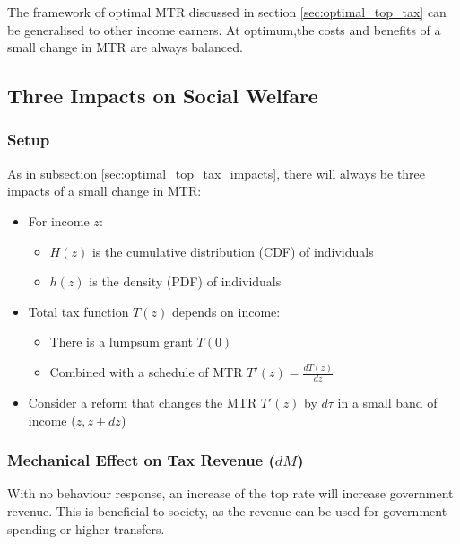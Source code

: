         The framework of optimal MTR discussed in section \ref{sec:optimal_top_tax} can be generalised to other income earners. At optimum,the costs and benefits of a small change in MTR are always balanced.

    \subsection{Three Impacts on Social Welfare}

        \subsubsection{Setup}
        
        As in subsection \ref{sec:optimal_top_tax_impacts}, there will always be three impacts of a small change in MTR:

        \begin{itemize}
            \item For income $z$:
            \begin{itemize}
                \item $H(z)$ is the cumulative distribution (CDF) of individuals
                \item $h(z)$ is the density (PDF) of individuals
            \end{itemize}
            \item Total tax function $T(z)$ depends on income:
            \begin{itemize}
                \item There is a lumpsum grant $T(0)$
                \item Combined with a schedule of MTR $T'(z)=\frac{dT(z)}{dz}$
            \end{itemize}
            \item Consider a reform that changes the MTR $T'(z)$ by $d\tau$ in a small band of income ($z,z+dz$)
        \end{itemize}
        
        \subsubsection{Mechanical Effect on Tax Revenue ($dM$)}

            With no behaviour response, an increase of the top rate will increase government revenue. This is beneficial to society, as the revenue can be used for government spending or higher transfers.

